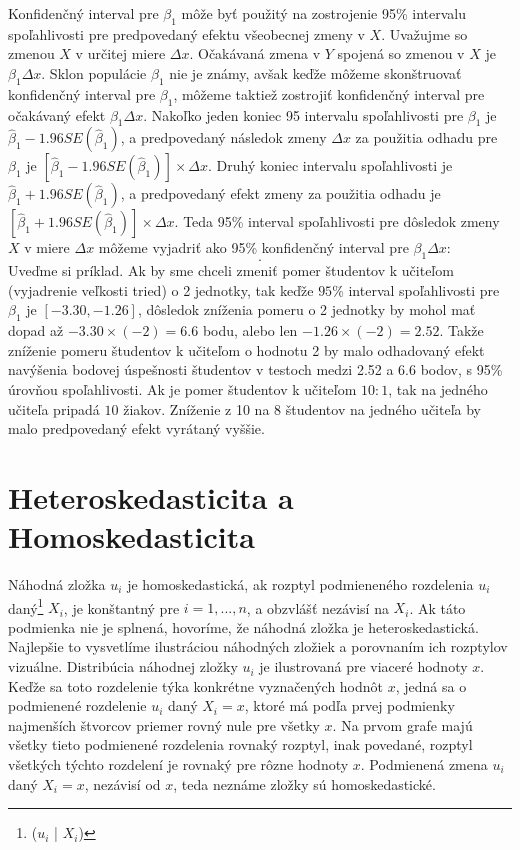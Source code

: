 \documentclass[]{tukediphc}
\begin{document}
Konfidenčný interval pre $\beta_1$ môže byť použitý na zostrojenie 95\% intervalu spoľahlivosti pre predpovedaný efektu všeobecnej zmeny v $X$. Uvažujme so zmenou $X$ v určitej miere $\Delta x$. Očakávaná zmena v $Y$ spojená so zmenou v $X$ je $\beta_{1} \Delta x$. Sklon populácie $\beta_1$ nie je známy, avšak keďže môžeme skonštruovať konfidenčný interval pre $\beta_1$, môžeme taktiež zostrojiť konfidenčný interval pre očakávaný efekt $\beta_{1} \Delta x$. Nakoľko jeden koniec 95 intervalu spoľahlivosti pre $\beta_1$ je $\hat\beta_{1} - 1.96SE(\hat\beta_{1})$, a predpovedaný následok zmeny $\Delta x$ za použitia odhadu pre $\beta_1$ je $[\hat\beta_{1} - 1.96SE(\hat\beta_{1})] \times \Delta x$. Druhý koniec intervalu spoľahlivosti je $\hat\beta_{1} + 1.96SE(\hat\beta_{1})$, a predpovedaný efekt zmeny za použitia odhadu je $[\hat\beta_{1} + 1.96SE(\hat\beta_{1})] \times \Delta x$. Teda 95\% interval spoľahlivosti pre dôsledok zmeny $X$ v miere $\Delta x$ môžeme vyjadriť ako 95\% konfidenčný interval pre $\beta_{1} \Delta x$:
\begin{equation}
   [\hat\beta_{1} - 1.96SE(\hat\beta_{1})\Delta x \ , \ \hat\beta_{1} + 1.96SE(\hat\beta_{1})\Delta x]. 
\end{equation}
Uveďme si príklad. Ak by sme chceli zmeniť pomer študentov k učiteľom (vyjadrenie veľkosti tried) o 2 jednotky, tak keďže $95\%$ interval spoľahlivosti pre $\beta_1$ je $[-3.30, -1.26]$, dôsledok zníženia pomeru o 2 jednotky by mohol mať dopad až $-3.30 \times (-2) = 6.6$ bodu, alebo len $-1.26 \times (-2) = 2.52$. Takže zníženie pomeru študentov k učiteľom o hodnotu 2 by malo odhadovaný efekt navýšenia bodovej úspešnosti študentov v testoch medzi 2.52 a 6.6 bodov, s 95\% úrovňou spoľahlivosti. Ak je pomer študentov k učiteľom $10:1$, tak na jedného učiteľa pripadá $10$ žiakov. Zníženie z 10 na 8 študentov na jedného učiteľa by malo predpovedaný efekt vyrátaný vyššie. 

\section{Heteroskedasticita a Homoskedasticita}

Náhodná zložka ${u}_{i}$  je homoskedastická, ak rozptyl podmieneného rozdelenia ${u}_{i}$ daný\footnote{(${u}_{i}$ | $X_{i}$)} $X_{i}$, je konštantný pre $i = 1, ..., n$, a obzvlášť nezávisí na $X_{i}$. Ak táto podmienka nie je splnená, hovoríme, že náhodná zložka je heteroskedastická. Najlepšie to vysvetlíme ilustráciou náhodných zložiek a porovnaním ich rozptylov vizuálne. Distribúcia náhodnej zložky ${u}_{i}$ je ilustrovaná pre viaceré hodnoty $x$. Keďže sa toto rozdelenie týka konkrétne vyznačených hodnôt $x$, jedná sa o podmienené rozdelenie ${u}_{i}$ daný $X_{i} = x$, ktoré má podľa prvej podmienky najmenších štvorcov priemer rovný nule pre všetky $x$. Na prvom grafe majú všetky tieto podmienené rozdelenia rovnaký rozptyl, inak povedané, rozptyl všetkých týchto rozdelení je rovnaký pre rôzne hodnoty $x$. Podmienená zmena ${u}_{i}$ daný $X_{i} = x$, nezávisí od $x$, teda neznáme zložky sú homoskedastické. 
\end{document}
